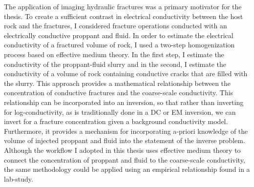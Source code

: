 The application of imaging hydraulic fractures was a primary motivator for the thesis. To create a sufficient contrast in electrical conductivity between the host rock and the fractures, I considered fracture operations conducted with an electrically conductive proppant and fluid. In order to estimate the electrical conductivity of a fractured volume of rock, I used a two-step homogenization process based on effective medium theory. In the first step, I estimate the conductivity of the proppant-fluid slurry and in the second, I estimate the conductivity of a volume of rock containing conductive cracks that are filled with the slurry. This approach provides a mathematical relationship between the concentration of conductive fractures and the coarse-scale conductivity. This relationship can be incorporated into an inversion, so that rather than inverting for log-conductivity, as is traditionally done in a DC or EM inversion, we can invert for a fracture concentration given a background conductivity model. Furthermore, it provides a mechanism for incorporating a-priori knowledge of the volume of injected proppant and fluid into the statement of the inverse problem. Although the workflow I adopted in this thesis uses effective medium theory to connect the concentration of proppant and fluid to the coarse-scale conductivity, the same methodology could be applied using an empirical relationship found in a lab-study.

